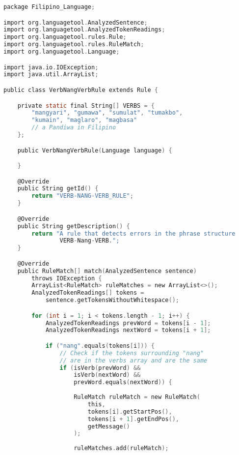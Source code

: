 \begin{lstlisting}[language=C, caption=Implementation of Pandiwa-Nang-Pandiwa Grammar Rule in Java]
package Filipino_Language;

import org.languagetool.AnalyzedSentence;
import org.languagetool.AnalyzedTokenReadings;
import org.languagetool.rules.Rule;
import org.languagetool.rules.RuleMatch;
import org.languagetool.Language;

import java.io.IOException; 
import java.util.ArrayList;

public class VerbNangVerbRule extends Rule {

    private static final String[] VERBS = {
        "mangyari", "gumawa", "sumulat", "tumakbo", 
        "kumain", "maglaro", "magbasa"  
        // a Pandiwa in Filipino
    };

    public VerbNangVerbRule(Language language) {

    }

    @Override
    public String getId() {
        return "VERB-NANG-VERB_RULE";
    }

    @Override
    public String getDescription() {
        return "A rule that detects errors in the phrase structure 
                VERB-Nang-VERB.";
    }

    @Override
    public RuleMatch[] match(AnalyzedSentence sentence) 
        throws IOException {
        ArrayList<RuleMatch> ruleMatches = new ArrayList<>();
        AnalyzedTokenReadings[] tokens = 
            sentence.getTokensWithoutWhitespace();

        for (int i = 1; i < tokens.length - 1; i++) {
            AnalyzedTokenReadings prevWord = tokens[i - 1];
            AnalyzedTokenReadings nextWord = tokens[i + 1];

            if ("nang".equals(tokens[i])) {
                // Check if the tokens surrounding "nang" 
                // are in the verbs array and are the same
                if (isVerb(prevWord) && 
                    isVerb(nextWord) && 
                    prevWord.equals(nextWord)) {
                    
                    RuleMatch ruleMatch = new RuleMatch(
                        this, 
                        tokens[i].getStartPos(), 
                        tokens[i + 1].getEndPos(), 
                        getMessage()
                    );
                    
                    ruleMatches.add(ruleMatch);


\end{lstlisting}
